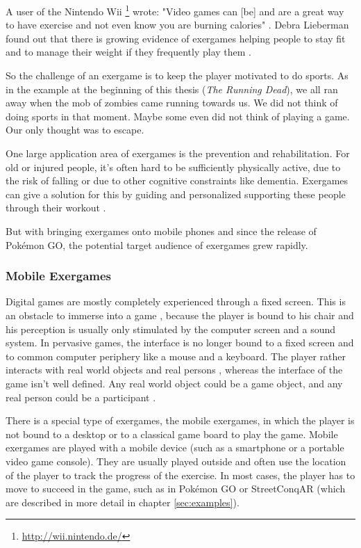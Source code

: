 A user of the Nintendo Wii \footnote{\url{http://wii.nintendo.de/}} wrote: "Video games can [be] and are a great way to have exercise and not even know you are burning calories" \citep{WiiSportsWeightLoss}. Debra Lieberman found out that there is growing evidence of exergames helping people to stay fit and to manage their weight if they frequently play them \citep{Lieberman06dancegames}.

So the challenge of an exergame is to keep the player motivated to do sports. As in the example at the beginning of this thesis (\emph{The Running Dead}), we all ran away when the mob of zombies came running towards us. We did not think of doing sports in that moment. Maybe some even did not think of playing a game. Our only thought was to escape.

One large application area of exergames is the prevention and rehabilitation. For old or injured people, it's often hard to be sufficiently physically active, due to the risk of falling or due to other cognitive constraints like dementia. Exergames can give a solution for this by guiding and personalized supporting these people through their workout \citep{gobel2011serious}.

But with bringing exergames onto mobile phones and since the release of Pok\'{e}mon GO, the potential target audience of exergames grew rapidly.

\subsubsection{Mobile Exergames}
Digital games are mostly completely experienced through a fixed screen. This is an obstacle to immerse into a game \citep{cheok2002touch}, because the player is bound to his chair and his perception is usually only stimulated by the computer screen and a sound system. In pervasive games, the interface is no longer bound to a fixed screen and to common computer periphery like a mouse and a keyboard. The player rather interacts with real world objects and real persons \citep{nieuwdorp2009pervasive}, whereas the interface of the game isn't well defined. Any real world object could be a game object, and any real person could be a participant \citep{montola2005exploring}.

There is a special type of exergames, the mobile exergames, in which the player is not bound to a desktop or to a classical game board to play the game. Mobile exergames are played with a mobile device (such as a smartphone or a portable video game console). They are usually played outside and often use the location of the player to track the progress of the exercise. In most cases, the player has to move to succeed in the game, such as in Pok\'{e}mon GO or StreetConqAR (which are described in more detail in chapter \ref{sec:examples}).


